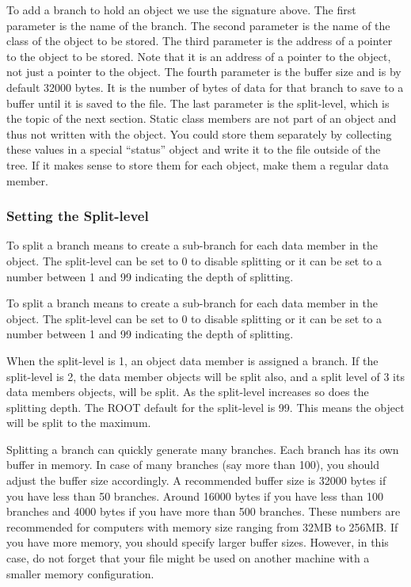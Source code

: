 \documentclass[12pt,a4paper]{article}
\begin{document}
To add a branch to hold an object we use the signature above. The first parameter is the name of the branch. The second parameter is the name of the class of the object to be stored. The third parameter is the address of a pointer to the object to be stored. Note that it is an address of a pointer to the object, not just a pointer to the object. The fourth parameter is the buffer size and is by default 32000 bytes. It is the number of bytes of data for that branch to save to a buffer until it is saved to the file. The last parameter is the split-level, which is the topic of the next section. Static class members are not part of an object and thus not written with the object. You could store them separately by collecting these values in a special “status” object and write it to the file outside of the tree. If it makes sense to store them for each object, make them a regular data member.

\subsubsection{Setting the Split-level}
To split a branch means to create a sub-branch for each data member in the object. The split-level can be set to 0 to disable splitting or it can be set to a number between 1 and 99 indicating the depth of splitting.

To split a branch means to create a sub-branch for each data member in the object. The split-level can be set to 0 to disable splitting or it can be set to a number between 1 and 99 indicating the depth of splitting.

When the split-level is 1, an object data member is assigned a branch. If the split-level is 2, the data member objects will be split also, and a split level of 3 its data members objects, will be split. As the split-level increases so does the splitting depth. The ROOT default for the split-level is 99. This means the object will be split to the maximum.

Splitting a branch can quickly generate many branches. Each branch has its own buffer in memory. In case of many branches (say more than 100), you should adjust the buffer size accordingly. A recommended buffer size is 32000 bytes if you have less than 50 branches. Around 16000 bytes if you have less than 100 branches and 4000 bytes if you have more than 500 branches. These numbers are recommended for computers with memory size ranging from 32MB to 256MB. If you have more memory, you should specify larger buffer sizes. However, in this case, do not forget that your file might be used on another machine with a smaller memory configuration.
\end{document}
